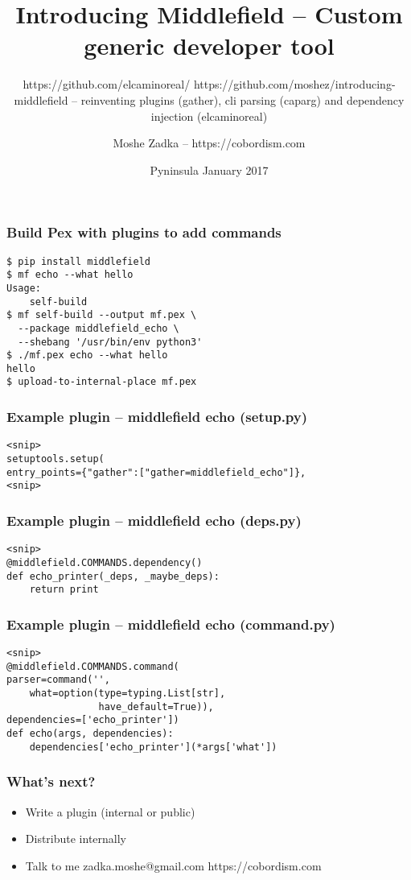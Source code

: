 \documentclass{beamer}
\title{Introducing Middlefield -- Custom generic developer tool}
\subtitle{https://github.com/elcaminoreal/ https://github.com/moshez/introducing-middlefield -- reinventing plugins (gather), cli parsing (caparg) and dependency injection (elcaminoreal)}
\author{Moshe Zadka -- https://cobordism.com}
\date{Pyninsula January 2017}
\begin{document}
 
\frame{\titlepage}

\begin{frame}[fragile]
\frametitle{Build Pex with plugins to add commands}
\begin{lstlisting}
$ pip install middlefield
$ mf echo --what hello
Usage:
    self-build
$ mf self-build --output mf.pex \
  --package middlefield_echo \
  --shebang '/usr/bin/env python3'
$ ./mf.pex echo --what hello 
hello
$ upload-to-internal-place mf.pex
\end{lstlisting}
\end{frame}

\begin{frame}[fragile]
\frametitle{Example plugin -- middlefield echo (setup.py)}
\begin{lstlisting}
<snip>
setuptools.setup(
entry_points={"gather":["gather=middlefield_echo"]},
<snip>
\end{lstlisting}
\end{frame}

\begin{frame}[fragile]
\frametitle{Example plugin -- middlefield echo (deps.py)}
\begin{lstlisting}
<snip>
@middlefield.COMMANDS.dependency()
def echo_printer(_deps, _maybe_deps):
    return print
\end{lstlisting}
\end{frame}

\begin{frame}[fragile]
\frametitle{Example plugin -- middlefield echo (command.py)}
\begin{lstlisting}
<snip>
@middlefield.COMMANDS.command(
parser=command('',
    what=option(type=typing.List[str],
                have_default=True)),
dependencies=['echo_printer'])
def echo(args, dependencies):
    dependencies['echo_printer'](*args['what'])
\end{lstlisting}
\end{frame}

\begin{frame}
\frametitle{What's next?}
\begin{itemize}
\item Write a plugin (internal or public)
\item Distribute internally
\item Talk to me zadka.moshe@gmail.com https://cobordism.com
\end{itemize}
\end{frame}
\end{document}
